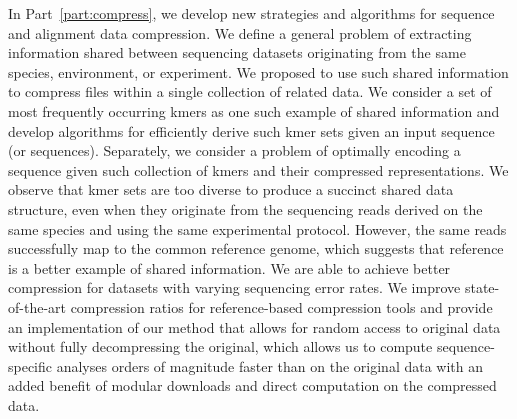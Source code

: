 \documentclass[12pt]{cmuthesis}
\begin{document}
In Part~\ref{part:compress}, we develop new strategies and algorithms for sequence and alignment data compression. We define a general problem of extracting information shared between sequencing datasets originating from the same species, environment, or experiment. We proposed to use such shared information to compress files within a single collection of related data. We consider a set of most frequently occurring kmers as one such example of shared information and develop algorithms for efficiently derive such kmer sets given an input sequence (or sequences). Separately, we consider a problem of optimally encoding a sequence given such collection of kmers and their compressed representations. We observe that kmer sets are too diverse to produce a succinct shared data structure, even when they originate from the sequencing reads derived on the same species and using the same experimental protocol. However, the same reads successfully map to the common reference genome, which suggests that reference is a better example of shared information. We are able to achieve better compression for datasets with varying sequencing error rates. We improve state-of-the-art compression ratios for reference-based compression tools and provide an implementation of our method that allows for random access to original data without fully decompressing the original, which allows us to compute sequence-specific analyses orders of magnitude faster than on the original data with an added benefit of modular downloads and direct computation on the compressed data.







\end{document}
